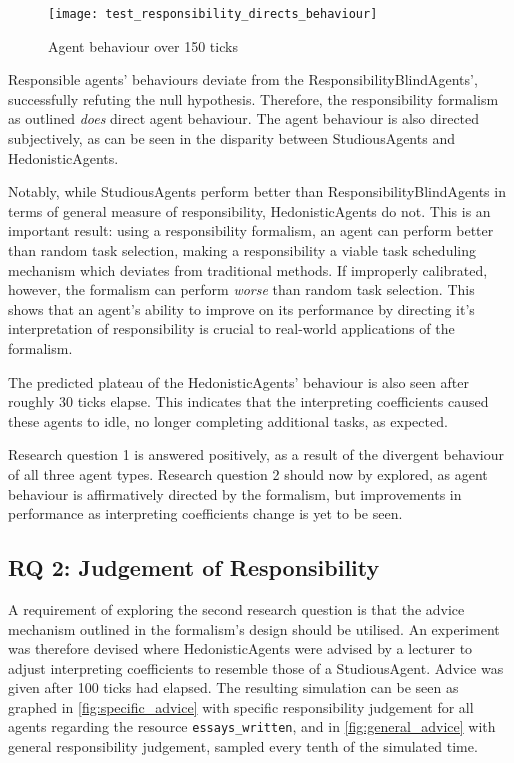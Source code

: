 \begin{figure}[h]
    \centering
    \texttt{[image: test\_responsibility\_directs\_behaviour]}
    \caption{Agent behaviour over 150 ticks}
    \label{fig:behaviour_direction}
\end{figure}

Responsible agents' behaviours deviate from the ResponsibilityBlindAgents', successfully refuting the null hypothesis. Therefore, the responsibility formalism as outlined \emph{does} direct agent behaviour. The agent behaviour is also directed subjectively, as can be seen in the disparity between StudiousAgents and HedonisticAgents.\par

Notably, while StudiousAgents perform better than ResponsibilityBlindAgents in terms of general measure of responsibility, HedonisticAgents do not. This is an important result: using a responsibility formalism, an agent can perform better than random task selection, making a responsibility a viable task scheduling mechanism which deviates from traditional methods. If improperly calibrated, however, the formalism can perform \emph{worse} than random task selection. This shows that an agent's ability to improve on its performance by directing it's interpretation of responsibility is crucial to real-world applications of the formalism.\par

The predicted plateau of the HedonisticAgents' behaviour is also seen after roughly 30 ticks elapse. This indicates that the interpreting coefficients caused these agents to idle, no longer completing additional tasks, as expected.\par

Research question 1 is answered positively, as a result of the divergent behaviour of all three agent types. Research question 2 should now by explored, as agent behaviour is affirmatively directed by the formalism, but improvements in performance as interpreting coefficients change is yet to be seen.\par

\subsection{RQ 2: Judgement of Responsibility}\label{subsec:RQ2}
A requirement of exploring the second research question is that the advice mechanism outlined in the formalism's design should be utilised. An experiment was therefore devised where HedonisticAgents were advised by a lecturer to adjust interpreting coefficients to resemble those of a StudiousAgent. Advice was given after 100 ticks had elapsed. The resulting simulation can be seen as graphed in \cref{fig:specific_advice} with specific responsibility judgement for all agents regarding the resource \texttt{essays\_written}, and in \cref{fig:general_advice} with general responsibility judgement, sampled every tenth of the simulated time.


